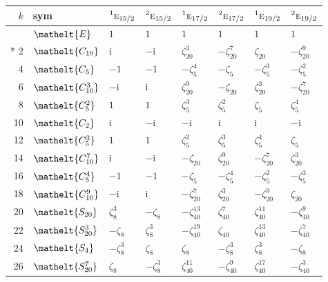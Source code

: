 \documentclass[10pt,a4paper]{article}
\numberwithin{equation}{section}
\newcommand{\eltfont}[1]{{\let\sigma\eltsigma\mathelt{#1}}}
\newcommand{\irr}[1]{\text{\normalfont\scshape #1}}
\newcommand{\conjpair}[1]{{}^{#1}}
\newcommand{\cls}[1]{\eltfont{#1}}
\newcommand{\iunit}{\mathrm{i}}
\newcommand{\rootunity}[1]{\zeta_{#1}}
\begin{document}
{\small\setlength{\tabcolsep}{4pt}
\begin{longtable}{@{}rlllllll@{}}\toprule
$k$ & sym & $\conjpair{1}\irr{e}_{15/2}$ & $\conjpair{2}\irr{e}_{15/2}$ & $\conjpair{1}\irr{e}_{17/2}$ & $\conjpair{2}\irr{e}_{17/2}$ & $\conjpair{1}\irr{e}_{19/2}$ & $\conjpair{2}\irr{e}_{19/2}$\\\midrule\endhead
\bottomrule\endfoot\endlastfoot
0 & $\cls{E}$ & $1$ & $1$ & $1$ & $1$ & $1$ & $1$\\*
2 & $\cls{C_{10}}$ & $\iunit{}$ & $-\iunit{}$ & $\rootunity{20}^{3}$ & $-\rootunity{20}^{7}$ & $\rootunity{20}$ & $-\rootunity{20}^{9}$\\
4 & $\cls{C_{5}}$ & $-1$ & $-1$ & $-\rootunity{5}^{4}$ & $-\rootunity{5}$ & $-\rootunity{5}^{3}$ & $-\rootunity{5}^{2}$\\
6 & $\cls{C_{10}^{3}}$ & $-\iunit{}$ & $\iunit{}$ & $\rootunity{20}^{9}$ & $-\rootunity{20}$ & $\rootunity{20}^{3}$ & $-\rootunity{20}^{7}$\\
8 & $\cls{C_{5}^{2}}$ & $1$ & $1$ & $\rootunity{5}^{3}$ & $\rootunity{5}^{2}$ & $\rootunity{5}$ & $\rootunity{5}^{4}$\\
10 & $\cls{C_{2}}$ & $\iunit{}$ & $-\iunit{}$ & $-\iunit{}$ & $\iunit{}$ & $\iunit{}$ & $-\iunit{}$\\
12 & $\cls{C_{5}^{3}}$ & $1$ & $1$ & $\rootunity{5}^{2}$ & $\rootunity{5}^{3}$ & $\rootunity{5}^{4}$ & $\rootunity{5}$\\
14 & $\cls{C_{10}^{7}}$ & $\iunit{}$ & $-\iunit{}$ & $-\rootunity{20}$ & $\rootunity{20}^{9}$ & $-\rootunity{20}^{7}$ & $\rootunity{20}^{3}$\\
16 & $\cls{C_{5}^{4}}$ & $-1$ & $-1$ & $-\rootunity{5}$ & $-\rootunity{5}^{4}$ & $-\rootunity{5}^{2}$ & $-\rootunity{5}^{3}$\\
18 & $\cls{C_{10}^{9}}$ & $-\iunit{}$ & $\iunit{}$ & $-\rootunity{20}^{7}$ & $\rootunity{20}^{3}$ & $-\rootunity{20}^{9}$ & $\rootunity{20}$\\
20 & $\cls{S_{20}}$ & $\rootunity{8}^{3}$ & $-\rootunity{8}$ & $-\rootunity{40}^{13}$ & $\rootunity{40}^{7}$ & $\rootunity{40}^{11}$ & $-\rootunity{40}^{9}$\\
22 & $\cls{S_{20}^{3}}$ & $-\rootunity{8}$ & $\rootunity{8}^{3}$ & $-\rootunity{40}^{19}$ & $\rootunity{40}$ & $\rootunity{40}^{13}$ & $-\rootunity{40}^{7}$\\
24 & $\cls{S_{4}}$ & $-\rootunity{8}^{3}$ & $\rootunity{8}$ & $\rootunity{8}$ & $-\rootunity{8}^{3}$ & $\rootunity{8}^{3}$ & $-\rootunity{8}$\\
26 & $\cls{S_{20}^{7}}$ & $\rootunity{8}$ & $-\rootunity{8}^{3}$ & $\rootunity{40}^{11}$ & $-\rootunity{40}^{9}$ & $\rootunity{40}^{17}$ & $-\rootunity{40}^{3}$\\

\end{longtable}}
\end{document}

